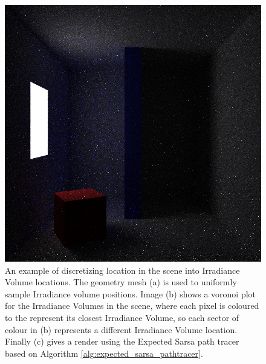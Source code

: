 \documentclass[../dissertation.tex]{subfiles}
\begin{document}
\begin{figure}[!htb]
\endminipage\hfill
{}
\includegraphics[width=1\textwidth]{images/renders/simple_room/reinforcement_16.png}
\endminipage
\caption{An example of discretizing location in the scene into Irradiance Volume locations. The geometry mesh (a) is used to uniformly sample Irradiance volume positions. Image (b) shows a voronoi plot for the Irradiance Volumes in the scene, where each pixel is coloured to the represent its closest Irradiance Volume, so each sector of colour in (b) represents a different Irradiance Volume location. Finally (c) gives a render using the Expected Sarsa path tracer based on Algorithm \ref{alg:expected_sarsa_pathtracer}.}
\label{fig:scene_discretization_example}
\end{figure}
\end{document}
